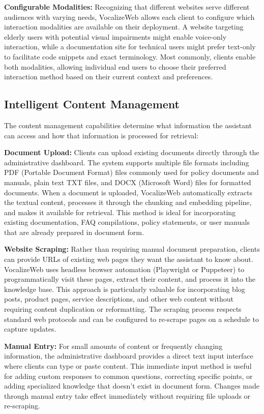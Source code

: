 \textbf{Configurable Modalities:} Recognizing that different websites serve different audiences with varying needs, VocalizeWeb allows each client to configure which interaction modalities are available on their deployment. A website targeting elderly users with potential visual impairments might enable voice-only interaction, while a documentation site for technical users might prefer text-only to facilitate code snippets and exact terminology. Most commonly, clients enable both modalities, allowing individual end users to choose their preferred interaction method based on their current context and preferences.

\subsection{Intelligent Content Management}

The content management capabilities determine what information the assistant can access and how that information is processed for retrieval:

\textbf{Document Upload:} Clients can upload existing documents directly through the administrative dashboard. The system supports multiple file formats including PDF (Portable Document Format) files commonly used for policy documents and manuals, plain text TXT files, and DOCX (Microsoft Word) files for formatted documents. When a document is uploaded, VocalizeWeb automatically extracts the textual content, processes it through the chunking and embedding pipeline, and makes it available for retrieval. This method is ideal for incorporating existing documentation, FAQ compilations, policy statements, or user manuals that are already prepared in document form.

\textbf{Website Scraping:} Rather than requiring manual document preparation, clients can provide URLs of existing web pages they want the assistant to know about. VocalizeWeb uses headless browser automation (Playwright or Puppeteer) to programmatically visit these pages, extract their content, and process it into the knowledge base. This approach is particularly valuable for incorporating blog posts, product pages, service descriptions, and other web content without requiring content duplication or reformatting. The scraping process respects standard web protocols and can be configured to re-scrape pages on a schedule to capture updates.

\textbf{Manual Entry:} For small amounts of content or frequently changing information, the administrative dashboard provides a direct text input interface where clients can type or paste content. This immediate input method is useful for adding custom responses to common questions, correcting specific points, or adding specialized knowledge that doesn't exist in document form. Changes made through manual entry take effect immediately without requiring file uploads or re-scraping.

